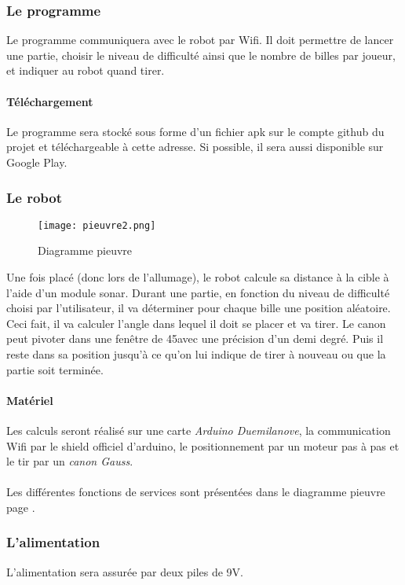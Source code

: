 \documentclass{article}
\begin{document}
\subsubsection{Le programme}
Le programme communiquera avec le robot par Wifi. Il doit permettre de lancer une partie, choisir le niveau de difficulté ainsi que le nombre de billes par joueur, et indiquer au robot quand tirer.
\paragraph{Téléchargement} Le programme sera stocké sous forme d'un fichier apk sur le compte github du projet et téléchargeable à cette adresse. Si possible, il sera aussi disponible sur Google Play.

\subsubsection{Le robot}
\begin{figure}
	\begin{center}
		\texttt{[image: pieuvre2.png]}
	\end{center}
	\caption{Diagramme pieuvre}
	\label{pieuvre}
\end{figure}

Une fois placé (donc lors de l'allumage), le robot calcule sa distance à la cible à l'aide d'un module sonar. Durant une partie, en fonction du niveau de difficulté choisi par l'utilisateur, il va déterminer pour chaque bille une position aléatoire. Ceci fait, il va calculer l'angle dans lequel il doit se placer et va tirer. Le canon peut pivoter dans une fenêtre de 45\degre avec une précision d'un demi degré. Puis il reste dans sa position jusqu'à ce qu'on lui indique de tirer à nouveau ou que la partie soit terminée.
\paragraph{Matériel} Les calculs seront réalisé sur une carte \emph{Arduino Duemilanove}, la communication Wifi par le shield officiel d'arduino, le positionnement par un moteur pas à pas et le tir par un \emph{canon Gauss}.
\paragraph{} Les différentes fonctions de services sont présentées dans le diagramme pieuvre page \pageref{pieuvre}.

\subsubsection{L'alimentation}
L'alimentation sera assurée par deux piles de 9V.
\end{document}
